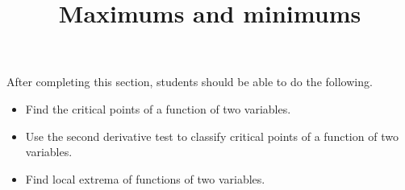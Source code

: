 \documentclass{ximera}
\title{Maximums and minimums}
\begin{document}
\begin{abstract}
\end{abstract}

\maketitle

\begin{sectionOutcomes}

  After completing this section, students should be able to do the following.

\begin{itemize}
\item Find the critical points of a function of two variables.
\item Use the second derivative test to classify critical points of a function of two variables.
\item Find local extrema of functions of two variables.
\end{itemize}

\end{sectionOutcomes}
\end{document}
